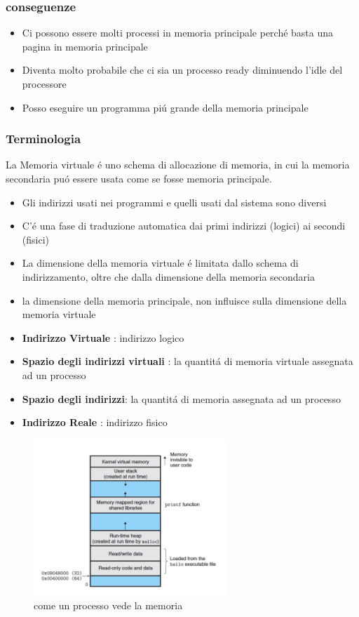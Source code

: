     \subsubsection*{conseguenze}
    \begin{itemize}
        \item Ci possono essere molti processi in memoria principale perché basta una pagina in memoria principale
        \item Diventa molto probabile che ci sia un processo ready diminuendo l'idle del processore
        \item Posso eseguire un programma piú grande della memoria principale
    \end{itemize}
    \subsubsection*{Terminologia}
    La Memoria virtuale é uno schema di allocazione di memoria, in cui la memoria secondaria puó essere usata come se
    fosse memoria principale.
    \begin{itemize}
        \item Gli indirizzi usati nei programmi e quelli usati dal sistema sono diversi
        \item C'é una fase di traduzione automatica dai primi indirizzi (logici) ai secondi (fisici)
        \item La dimensione della memoria virtuale é limitata dallo schema di indirizzamento, oltre che
        dalla dimensione della memoria secondaria
        \item la dimensione della memoria principale, non influisce sulla dimensione della memoria virtuale
        \item \textbf{Indirizzo Virtuale} : indirizzo logico
        \item \textbf{Spazio degli indirizzi virtuali} : la quantitá di memoria virtuale assegnata ad un processo
        \item \textbf{Spazio degli indirizzi}: la quantitá di memoria assegnata ad un processo
        \item \textbf{Indirizzo Reale} : indirizzo fisico
    \end{itemize}

    \begin{figure}[H]
        \centering
        \includegraphics[width=0.65\textwidth]{immagini/comeunprocessovedelamemoria}
        \caption{come un processo vede la memoria}
        \label{fig:comeunprocessovedelamemoria}
    \end{figure}
